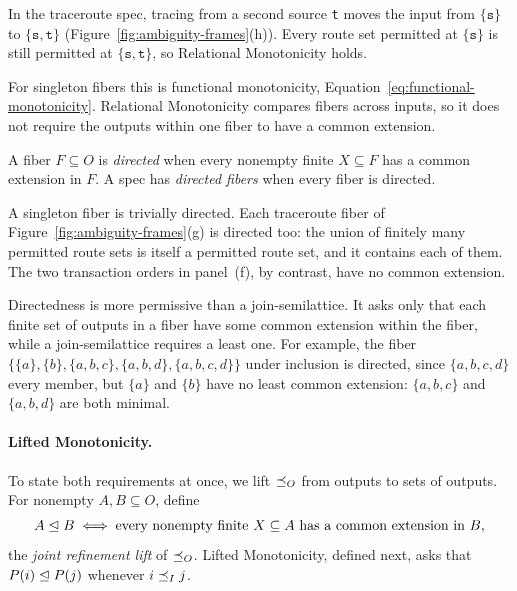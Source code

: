 In the traceroute spec, tracing from a second source \texttt{t} moves the
input from $\{\texttt{s}\}$ to $\{\texttt{s},\texttt{t}\}$
(Figure~\ref{fig:ambiguity-frames}(h)).  Every route set permitted at
$\{\texttt{s}\}$ is still permitted at $\{\texttt{s},\texttt{t}\}$, so
Relational Monotonicity holds.

For singleton fibers this is functional monotonicity,
Equation~\ref{eq:functional-monotonicity}.  Relational Monotonicity compares fibers across inputs, so it does not
require the outputs within one fiber to have a common extension.

\begin{definition}
\label{def:fiber-directedness}\label{def:directed-outputs}
A fiber $F\subseteq O$ is \emph{directed} when every nonempty finite
$X\subseteq F$ has a common extension in $F$.  A spec has \emph{directed fibers} when
every fiber is directed.
\end{definition}

A singleton fiber is trivially directed.  Each traceroute fiber of
Figure~\ref{fig:ambiguity-frames}(g) is directed too: the union of finitely
many permitted route sets is itself a permitted route set, and it contains each
of them.  The two transaction orders in panel~(f), by contrast, have no common extension.

Directedness is more permissive than a join-semilattice.  It asks only that
each finite set of outputs in a fiber have some common extension within the
fiber, while a join-semilattice requires a least one.  For example, the fiber
$\{\{a\},\{b\},\{a,b,c\},\{a,b,d\},\{a,b,c,d\}\}$ under inclusion is directed,
since $\{a,b,c,d\}$ \outrel every member, but $\{a\}$ and $\{b\}$ have no least common extension: $\{a,b,c\}$ and $\{a,b,d\}$ are both minimal.

\paragraph{Lifted Monotonicity.}
To state both requirements at once, we lift $\preceq_O$ from outputs to sets
of outputs.  For nonempty
$A,B\subseteq O$, define
        \begin{equation}
  A\trianglelefteq B
  \;\Longleftrightarrow\;
  \text{every nonempty finite }X\subseteq A\text{ has a common extension in }B,
  \label{eq:joint-output-order}
        \end{equation}
the \emph{joint refinement lift} of $\preceq_O$.  Lifted Monotonicity, defined
next, asks that $P(i)\trianglelefteq P(j)$ whenever $i\preceq_I j$.

